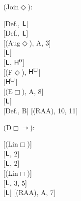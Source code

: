 \documentclass[a4paper,english,fleqn,11pt,final]{scrartcl}
\newcommand{\logicOpFont}[1]{\mathsf{#1}}
\newcommand{\negg}{{\sim}}
\newcommand{\E}{\protect\ensuremath\logicOpFont{E}}
\newcommand{\sfH}{\protect\ensuremath{\mathsf{H}}}
\newcommand{\sfL}{\protect\ensuremath{\mathsf{L}}}
\newcommand{\timp}{\rightarrowtriangle}
\newcommand{\Deriv}[1]{{\normalfont\textsf{#1}}}
\newcommand{\oland}{\owedge}
\theoremstyle{plain}
\theoremstyle{definition}
\begin{document}
{\begin{minipage}[t][][b]{.46\textwidth}
\Deriv{(Join$\Diamond$)}:

\medskip

{
\setlength{\fitchprfwidth}{1.58in}
\fitchprf{
\pline[A ]{\Diamond\alpha}\\
\pline[B ]{\Diamond\E\alpha}
}
{
\subproof{\pline[1 ]{\negg\Diamond(\alpha \oland \E\alpha)}}
{
	\pline[2 ]{\triangle\negg(\alpha \oland \E\alpha)}[Def., $\sfL$]\\
	\pline[3 ]{\triangle(\alpha \timp \neg\alpha)}[Def., $\sfL$]\\
	\pline[4 ]{\Diamond(\alpha \oland (\alpha \timp \neg\alpha))}[\Deriv{(Aug$\Diamond$)}, A, 3]\\
	\pline[5 ]{\Diamond(\alpha \oland \neg\alpha)}[$\sfL$]\\
	\pline[6 ]{\Diamond\bot}[$\sfL$, $\sfH^0$]\\
	\pline[7 ]{\bot}[\Deriv{(F$\Diamond$)}, $\sfH^\Box$]\\
	\pline[8 ]{\Box\neg\alpha}[$\sfH^\Box$]\\
	\pline[9 ]{\triangle\neg\alpha}[\Deriv{(E$\Box$)}, A, 8]\\
	\pline[10]{\triangle\negg\negg\neg\alpha}[$\sfL$]\\
	\pline[11]{\negg\triangle\negg\negg\neg\alpha}[Def., B]
}
	\pline[\slider]{\Diamond(\alpha\oland\E\alpha)}[\Deriv{(RAA)}, 10, 11]
}
}
\end{minipage}







\bigskip








\begin{minipage}[t][][b]{.43\textwidth}

\Deriv{(D$\Box{\timp}$)}:

\medskip

{
\setlength{\fitchprfwidth}{1.2in}
\fitchprf{
\pline[A ]{\Box\varphi \timp \Box \psi}
}
{
\subproof{\pline[1 ]{\negg\Box(\varphi\timp\psi)}}
{
	\pline[2 ]{\Box\negg(\varphi \timp \psi)}[\Deriv{(Lin$\Box$)}]\\
	\pline[3 ]{\Box\varphi}[$\sfL$, 2]\\
	\pline[4 ]{\Box\negg\psi}[$\sfL$, 2]\\
	\pline[5 ]{\negg\Box\psi}[\Deriv{(Lin$\Box$)}]\\
	\pline[6 ]{\Box \varphi \oland \negg \Box\psi}[$\sfL$, 3, 5]\\
	\pline[7 ]{\negg(\Box \varphi \timp \Box\psi)}[$\sfL$]
}
	\pline[\slider]{\Box(\varphi\timp\psi)}[\Deriv{(RAA)}, A, 7]
}
}
\end{minipage}
\begin{minipage}[t][][b]{.46\textwidth}


\end{minipage}}
\end{document}
